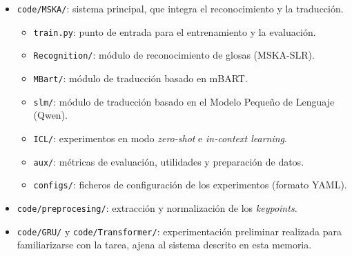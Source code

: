 \begin{itemize}
    \item \texttt{code/MSKA/}: sistema principal, que integra el reconocimiento y la traducción.
    \begin{itemize}
        \item \texttt{train.py}: punto de entrada para el entrenamiento y la evaluación.
        \item \texttt{Recognition/}: módulo de reconocimiento de glosas (MSKA-SLR).
        \item \texttt{MBart/}: módulo de traducción basado en mBART.
        \item \texttt{slm/}: módulo de traducción basado en el Modelo Pequeño de Lenguaje (Qwen).
        \item \texttt{ICL/}: experimentos en modo \textit{zero-shot} e \textit{in-context learning}.
        \item \texttt{aux/}: métricas de evaluación, utilidades y preparación de datos.
        \item \texttt{configs/}: ficheros de configuración de los experimentos (formato YAML).
    \end{itemize}
    \item \texttt{code/preprocesing/}: extracción y normalización de los \textit{keypoints}.
    \item \texttt{code/GRU/} y \texttt{code/Transformer/}: experimentación preliminar realizada para familiarizarse con la tarea, ajena al sistema descrito en esta memoria.
\end{itemize}
